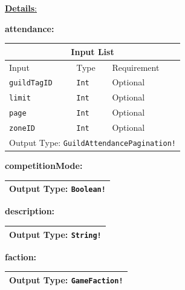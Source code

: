 \documentclass[10pt, a4paper]{memoir}
\numberwithin{equation}{section}
\theoremstyle{plain}
\theoremstyle{defp}
\theoremstyle{dotless}
\theoremstyle{definition}
\theoremstyle{dotless}
\theoremstyle{dotless}
\theoremstyle{defp}
\theoremstyle{defp}
\theoremstyle{be}          %
\theoremstyle{defp}
\newcommand\ttt[1]{\texttt{#1}}
\begin{document}
\underline{\textbf{Details}:}

\textbf{attendance:}

\begin{table}[h!]
	\centering
	\begin{tabular}{ |p{4.2cm}|p{6cm}|p{3cm}|  }
		\hline
		\multicolumn{3}{|c|}{Input List} \\
		\hline
		Input & Type & Requirement\\
		\hline
		\ttt{guildTagID} & \ttt{Int} & Optional\\
		\ttt{limit} & \ttt{Int} & Optional\\
		\ttt{page} & \ttt{Int} & Optional\\
		\ttt{zoneID} & \ttt{Int} & Optional\\
		\hline
		\multicolumn{3}{|c|}{Output Type: \ttt{GuildAttendancePagination!}} \\
		\hline
	\end{tabular}
\end{table}

\medskip

\textbf{competitionMode:}

\begin{table}[h!]
	\centering
	\begin{tabular}{ |p{4.2cm}|p{6cm}|p{3cm}|  }
		\hline
		\multicolumn{3}{|c|}{Output Type: \ttt{Boolean!}} \\
		\hline
	\end{tabular}
\end{table}

\medskip

\textbf{description:}

\begin{table}[h!]
	\centering
	\begin{tabular}{ |p{4.2cm}|p{6cm}|p{3cm}|  }
		\hline
		\multicolumn{3}{|c|}{Output Type: \ttt{String!}} \\
		\hline
	\end{tabular}
\end{table}

\medskip

\textbf{faction:}

\begin{table}[h!]
	\centering
	\begin{tabular}{ |p{4.2cm}|p{6cm}|p{3cm}|  }
		\hline
		\multicolumn{3}{|c|}{Output Type: \ttt{GameFaction!}} \\
		\hline
	\end{tabular}
\end{table}
\end{document}
